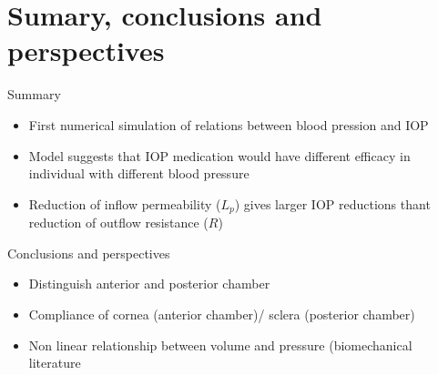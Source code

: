 \section{Sumary, conclusions and perspectives}
\begin{frame}{Summary}
\begin{itemize}
\item First numerical simulation of relations between blood pression and IOP
\item Model suggests that IOP medication would have different efficacy in individual with different blood pressure
\item Reduction of inflow permeability ($L_p$) gives larger IOP reductions thant reduction of outflow resistance ($R$)
\end{itemize}
\end{frame}
\begin{frame}{Conclusions and perspectives}
\begin{itemize}
\item Distinguish anterior and posterior chamber

\item Compliance of cornea (anterior chamber)/ sclera (posterior chamber)

\item<2>{Non linear relationship between volume and pressure (biomechanical literature}
\end{itemize}


\end{frame}

